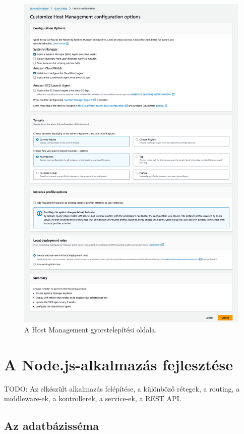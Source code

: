 \begin{figure}[ht]
  \centering
  \includegraphics[width=152mm, keepaspectratio]{figures/hostmgmt.png}
  \caption{A Host Management gyorstelepítési oldala.}
  \label{fig:hostmgmt}
\end{figure}

\section{A Node.js-alkalmazás fejlesztése}

TODO: Az elkészült alkalmazás felépítése, a különböző rétegek, a routing, a middleware-ek, a kontrollerek, a service-ek, a REST API.

\subsection{Az adatbázisséma}

